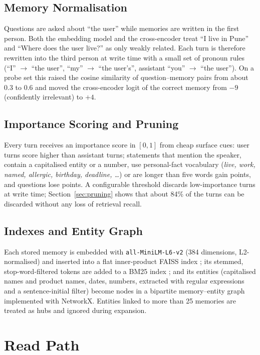 \subsection{Memory Normalisation}
\label{sec:normalisation}
Questions are asked about ``the user'' while memories are written in the first person. Both the embedding
model and the cross-encoder treat ``I live in Pune'' and ``Where does the user live?'' as only weakly
related. Each turn is therefore rewritten into the third person at write time with a small set of pronoun
rules (``I'' $\rightarrow$ ``the user'', ``my'' $\rightarrow$ ``the user's'', assistant ``you'' $\rightarrow$
``the user''). On a probe set this raised the cosine similarity of question--memory pairs from about 0.3 to
0.6 and moved the cross-encoder logit of the correct memory from $-9$ (confidently irrelevant) to $+4$.

\subsection{Importance Scoring and Pruning}
Every turn receives an importance score in $[0,1]$ from cheap surface cues: user turns score higher than
assistant turns; statements that mention the speaker, contain a capitalised entity or a number, use
personal-fact vocabulary (\emph{live, work, named, allergic, birthday, deadline, \dots}) or are longer than
five words gain points, and questions lose points. A configurable threshold discards low-importance turns at
write time; Section~\ref{sec:pruning} shows that about 84\% of the turns can be discarded without any loss of
retrieval recall.

\subsection{Indexes and Entity Graph}
Each stored memory is embedded with \texttt{all-MiniLM-L6-v2} \cite{sbert} (384 dimensions, L2-normalised)
and inserted into a flat inner-product FAISS index \cite{faiss}; its stemmed, stop-word-filtered tokens are
added to a BM25 index \cite{bm25}; and its entities (capitalised names and product names, dates, numbers,
extracted with regular expressions and a sentence-initial filter) become nodes in a bipartite memory--entity
graph implemented with NetworkX. Entities linked to more than 25 memories are treated as hubs and ignored
during expansion.

\section{Read Path}
